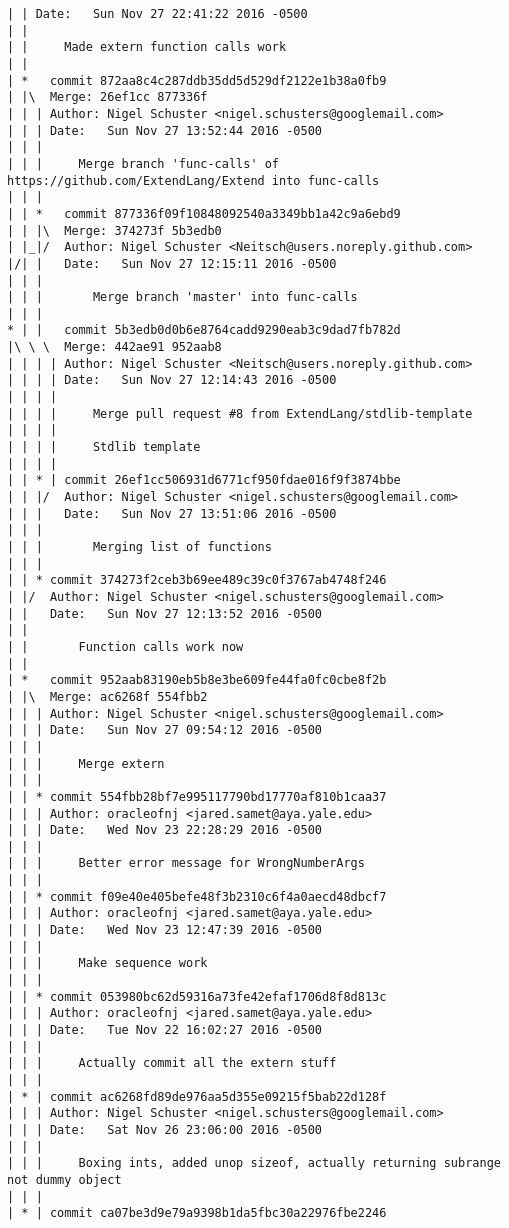 \begin{lstlisting}
| | Date:   Sun Nov 27 22:41:22 2016 -0500
| | 
| |     Made extern function calls work
| |     
| *   commit 872aa8c4c287ddb35dd5d529df2122e1b38a0fb9
| |\  Merge: 26ef1cc 877336f
| | | Author: Nigel Schuster <nigel.schusters@googlemail.com>
| | | Date:   Sun Nov 27 13:52:44 2016 -0500
| | | 
| | |     Merge branch 'func-calls' of https://github.com/ExtendLang/Extend into func-calls
| | |      
| | *   commit 877336f09f10848092540a3349bb1a42c9a6ebd9
| | |\  Merge: 374273f 5b3edb0
| |_|/  Author: Nigel Schuster <Neitsch@users.noreply.github.com>
|/| |   Date:   Sun Nov 27 12:15:11 2016 -0500
| | |   
| | |       Merge branch 'master' into func-calls
| | |      
* | |   commit 5b3edb0d0b6e8764cadd9290eab3c9dad7fb782d
|\ \ \  Merge: 442ae91 952aab8
| | | | Author: Nigel Schuster <Neitsch@users.noreply.github.com>
| | | | Date:   Sun Nov 27 12:14:43 2016 -0500
| | | | 
| | | |     Merge pull request #8 from ExtendLang/stdlib-template
| | | |     
| | | |     Stdlib template
| | | |     
| | * | commit 26ef1cc506931d6771cf950fdae016f9f3874bbe
| | |/  Author: Nigel Schuster <nigel.schusters@googlemail.com>
| | |   Date:   Sun Nov 27 13:51:06 2016 -0500
| | |   
| | |       Merging list of functions
| | |    
| | * commit 374273f2ceb3b69ee489c39c0f3767ab4748f246
| |/  Author: Nigel Schuster <nigel.schusters@googlemail.com>
| |   Date:   Sun Nov 27 12:13:52 2016 -0500
| |   
| |       Function calls work now
| |     
| *   commit 952aab83190eb5b8e3be609fe44fa0fc0cbe8f2b
| |\  Merge: ac6268f 554fbb2
| | | Author: Nigel Schuster <nigel.schusters@googlemail.com>
| | | Date:   Sun Nov 27 09:54:12 2016 -0500
| | | 
| | |     Merge extern
| | |    
| | * commit 554fbb28bf7e995117790bd17770af810b1caa37
| | | Author: oracleofnj <jared.samet@aya.yale.edu>
| | | Date:   Wed Nov 23 22:28:29 2016 -0500
| | | 
| | |     Better error message for WrongNumberArgs
| | |    
| | * commit f09e40e405befe48f3b2310c6f4a0aecd48dbcf7
| | | Author: oracleofnj <jared.samet@aya.yale.edu>
| | | Date:   Wed Nov 23 12:47:39 2016 -0500
| | | 
| | |     Make sequence work
| | |    
| | * commit 053980bc62d59316a73fe42efaf1706d8f8d813c
| | | Author: oracleofnj <jared.samet@aya.yale.edu>
| | | Date:   Tue Nov 22 16:02:27 2016 -0500
| | | 
| | |     Actually commit all the extern stuff
| | |    
| * | commit ac6268fd89de976aa5d355e09215f5bab22d128f
| | | Author: Nigel Schuster <nigel.schusters@googlemail.com>
| | | Date:   Sat Nov 26 23:06:00 2016 -0500
| | | 
| | |     Boxing ints, added unop sizeof, actually returning subrange not dummy object
| | |    
| * | commit ca07be3d9e79a9398b1da5fbc30a22976fbe2246

\end{lstlisting}
